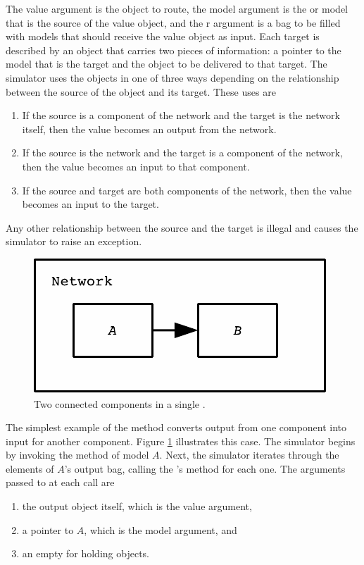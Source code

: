 The value argument is the object to route, the model argument is the  or  model that is the source of the value object, and the r argument is a bag to be filled with models that should receive the value object as input. Each target is described by an  object that carries two pieces of information: a pointer to the model that is the target and the object to be delivered to that target. The simulator uses the  objects in one of three ways depending on the relationship between the source of the object and its target. These uses are
\begin{enumerate}
\item If the source is a component of the network and the target is the network itself, then the value becomes an output from the network.
\item If the source is the network and the target is a component of the network, then the value becomes an input to that component.
\item If the source and target are both components of the network, then the value becomes an input to the target.
\end{enumerate}
Any other relationship between the source and the target is illegal and causes the simulator to raise an exception.

\begin{figure}[ht]
\centering
\includegraphics{network_models_figs/connected_atomic_models.pdf}
\caption{Two connected  components in a single .}
\label{fig:atomic_to_atomic_coupling}
\end{figure} 
The simplest example of the  method converts output from one  component into input for another  component. Figure \ref{fig:atomic_to_atomic_coupling} illustrates this case. The simulator begins by invoking the  method of  model $A$. Next, the simulator iterates through the elements of $A$'s output bag, calling the 's  method for each one. The arguments passed to  at each call are
\begin{enumerate}
\item the output object itself, which is the value argument,
\item a pointer to $A$, which is the model argument, and
\item an empty  for holding  objects.
\end{enumerate} 

